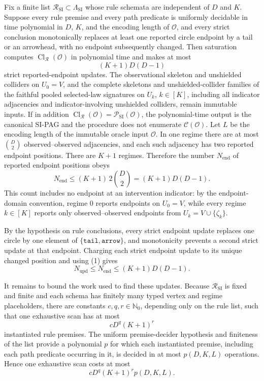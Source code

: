 Fix a finite list \(\mathcal R_{\mathrm{SI}}\subset\Lambda_{\mathrm{SI}}\) whose rule schemata are independent of \(D\) and \(K\). Suppose every rule premise and every path predicate is uniformly decidable in time polynomial in \(D\), \(K\), and the encoding length of \(\mathcal O\), and every strict conclusion monotonically replaces at least one reported circle endpoint by a tail or an arrowhead, with no endpoint subsequently changed. Then saturation computes \(\operatorname{Cl}_{\mathcal R}(\mathcal O)\) in polynomial time and makes at most
\[
 (K+1)D(D-1)
\]
strict reported-endpoint updates. The observational skeleton and unshielded colliders on \(U_0=V\), and the complete skeletons and unshielded-collider families of the faithful pooled selected-law signatures on \(U_k\), \(k\in[K]\), including all indicator adjacencies and indicator-involving unshielded colliders, remain immutable inputs. If in addition \(\operatorname{Cl}_{\mathcal R}(\mathcal O)=\mathcal P_{\mathrm{SI}}(\mathcal O)\), the polynomial-time output is the canonical SI-PAG and the procedure does not enumerate \(\mathcal C(\mathcal O)\).
Let \(L\) be the encoding length of the immutable oracle input \(\mathcal O\). In one regime there are at most \(\binom D2\) observed--observed adjacencies, and each such adjacency has two reported endpoint positions. There are \(K+1\) regimes. Therefore the number \(N_{\mathrm{end}}\) of reported endpoint positions obeys
\[
 N_{\mathrm{end}}
 \le (K+1)\,2\binom D2
 =(K+1)D(D-1).
\tag{1}
\]
This count includes no endpoint at an intervention indicator: by the endpoint-domain convention, regime \(0\) reports endpoints on \(U_0=V\), while every regime \(k\in[K]\) reports only observed--observed endpoints from \(U_k=V\cup\{\zeta_k\}\).

By the hypothesis on rule conclusions, every strict endpoint update replaces one circle by one element of \(\{\mathtt{tail},\mathtt{arrow}\}\), and monotonicity prevents a second strict update at that endpoint. Charging each strict endpoint update to its unique changed position and using (1) gives
\[
 N_{\mathrm{upd}}
 \le N_{\mathrm{end}}
 \le (K+1)D(D-1).
\tag{2}
\]

It remains to bound the work used to find these updates. Because \(\mathcal R_{\mathrm{SI}}\) is fixed and finite and each schema has finitely many typed vertex and regime placeholders, there are constants \(c,q,r\in\mathbb N_0\), depending only on the rule list, such that one exhaustive scan has at most
\[
 cD^q(K+1)^r
\tag{3}
\]
instantiated rule premises. The uniform premise-decider hypothesis and finiteness of the list provide a polynomial \(p\) for which each instantiated premise, including each path predicate occurring in it, is decided in at most \(p(D,K,L)\) operations. Hence one exhaustive scan costs at most
\[
 cD^q(K+1)^r p(D,K,L).
\tag{4}
\]

